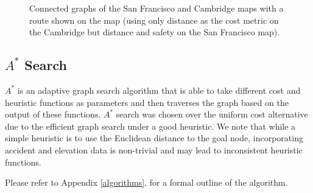 \documentclass[11pt]{article}
\begin{document}
\begin{figure}%
    \centering
    \qquad
    \caption{Connected graphs of the San Francisco and Cambridge maps with a route shown on the map (using only distance as the cost metric on the Cambridge but distance and safety on the San Francisco map).}
    \label{connected_graphs}%
\end{figure}

\subsection{$A^{*}$ Search}
$A^{*}$ is an adaptive graph search algorithm that is able to take different cost and heuristic functions as parameters and then traverses the graph based on the output of these functions. $A^{*}$ search was chosen over the uniform cost alternative due to the efficient graph search under a good heuristic. We note that while a simple heuristic is to use the Euclidean distance to the goal node, incorporating accident and elevation data is non-trivial and may lead to inconsistent heuristic functions.\par
Please refer to Appendix \ref{algorithms},  for a formal outline of the algorithm.
\end{document}

